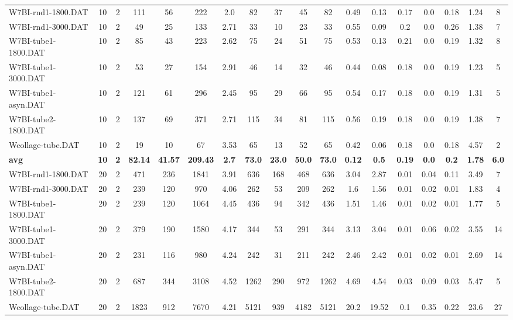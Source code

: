 \begin{sidewaystable}[h]
{\begin{tabular}{lccccccccccccccccc}
W7BI-rnd1-1800.DAT & 10 & 2 & 111 & 56 & 222 & 2.0 & 82 & 37 & 45 & 82 & 0.49 & 0.13 & 0.17 & 0.0 & 0.18 & 1.24 & 8\\
W7BI-rnd1-3000.DAT & 10 & 2 & 49 & 25 & 133 & 2.71 & 33 & 10 & 23 & 33 & 0.55 & 0.09 & 0.2 & 0.0 & 0.26 & 1.38 & 7\\
W7BI-tube1-1800.DAT & 10 & 2 & 85 & 43 & 223 & 2.62 & 75 & 24 & 51 & 75 & 0.53 & 0.13 & 0.21 & 0.0 & 0.19 & 1.32 & 8\\
W7BI-tube1-3000.DAT & 10 & 2 & 53 & 27 & 154 & 2.91 & 46 & 14 & 32 & 46 & 0.44 & 0.08 & 0.18 & 0.0 & 0.19 & 1.23 & 5\\
W7BI-tube1-asyn.DAT & 10 & 2 & 121 & 61 & 296 & 2.45 & 95 & 29 & 66 & 95 & 0.54 & 0.17 & 0.18 & 0.0 & 0.19 & 1.31 & 5\\
W7BI-tube2-1800.DAT & 10 & 2 & 137 & 69 & 371 & 2.71 & 115 & 34 & 81 & 115 & 0.56 & 0.19 & 0.18 & 0.0 & 0.19 & 1.38 & 7\\
Wcollage-tube.DAT & 10 & 2 & 19 & 10 & 67 & 3.53 & 65 & 13 & 52 & 65 & 0.42 & 0.06 & 0.18 & 0.0 & 0.18 & 4.57 & 2\\
\cline{1-18} \textbf{avg} & \textbf{10} & \textbf{2} & \textbf{82.14} & \textbf{41.57} & \textbf{209.43} & \textbf{2.7} & \textbf{73.0} & \textbf{23.0} & \textbf{50.0} & \textbf{73.0} & \textbf{0.12} & \textbf{0.5} & \textbf{0.19} & \textbf{0.0} & \textbf{0.2} & \textbf{1.78} & \textbf{6.0} \\ \cline{1-18}
W7BI-rnd1-1800.DAT & 20 & 2 & 471 & 236 & 1841 & 3.91 & 636 & 168 & 468 & 636 & 3.04 & 2.87 & 0.01 & 0.04 & 0.11 & 3.49 & 7\\
W7BI-rnd1-3000.DAT & 20 & 2 & 239 & 120 & 970 & 4.06 & 262 & 53 & 209 & 262 & 1.6 & 1.56 & 0.01 & 0.02 & 0.01 & 1.83 & 4\\
W7BI-tube1-1800.DAT & 20 & 2 & 239 & 120 & 1064 & 4.45 & 436 & 94 & 342 & 436 & 1.51 & 1.46 & 0.01 & 0.02 & 0.01 & 1.77 & 5\\
W7BI-tube1-3000.DAT & 20 & 2 & 379 & 190 & 1580 & 4.17 & 344 & 53 & 291 & 344 & 3.13 & 3.04 & 0.01 & 0.06 & 0.02 & 3.55 & 14\\
W7BI-tube1-asyn.DAT & 20 & 2 & 231 & 116 & 980 & 4.24 & 242 & 31 & 211 & 242 & 2.46 & 2.42 & 0.01 & 0.02 & 0.01 & 2.69 & 14\\
W7BI-tube2-1800.DAT & 20 & 2 & 687 & 344 & 3108 & 4.52 & 1262 & 290 & 972 & 1262 & 4.69 & 4.54 & 0.03 & 0.09 & 0.03 & 5.47 & 5\\
Wcollage-tube.DAT & 20 & 2 & 1823 & 912 & 7670 & 4.21 & 5121 & 939 & 4182 & 5121 & 20.2 & 19.52 & 0.1 & 0.35 & 0.22 & 23.6 & 27\\

\end{tabular}}
\end{sidewaystable}
